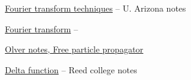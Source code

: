 \href{http://math.arizona.edu/~kglasner/math456/fouriertransform.pdf}{Fourier transform techniques} -- U. Arizona notes

\href{https://www.math.utah.edu/~gustafso/s2013/3150/pdeNotes/fourierTransorm-PeterOlver2013.pdf}{Fourier transform} -- 

\href{http://www.physics.rutgers.edu/~steves/501/Lectures_Final/Lec06_Propagator.pdf}{Olver notes, Free particle propagator}

\href{http://www.reed.edu/physics/faculty/wheeler/documents/Miscellaneous%20Math/Delta%20Functions/Simplified%20Dirac%20Delta.pdf}{Delta function} -- Reed college notes

